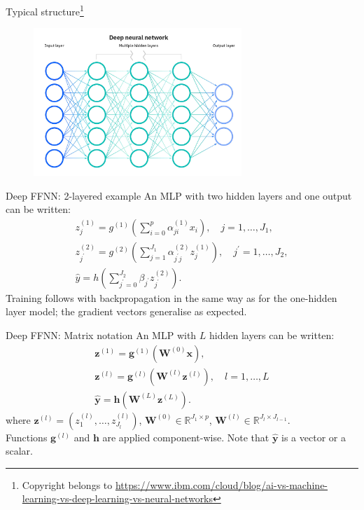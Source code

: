 \documentclass{beamer}
\begin{document}
\begin{frame}{Typical structure\footnote{Copyright belongs to \url{https://www.ibm.com/cloud/blog/ai-vs-machine-learning-vs-deep-learning-vs-neural-networks}}}
\begin{figure}
\includegraphics[width=0.7\textwidth]{Images/nn.jpg}
\end{figure}
\end{frame}
\begin{frame}{Deep FFNN: 2-layered example}
An MLP with two hidden layers and one output can be written:
$$
\begin{gathered}
z^{(1)}_{j}=g^{(1)}\left(\sum_{i=0}^{p} \alpha^{(1)}_{j i} x_{i}\right), \quad j=1, \ldots, J_{1}, \\
z^{(2)}_{j^{\prime}}=g^{(2)}\left(\sum_{j=1}^{J_{1}} \alpha^{(2)}_{j^{\prime} j} z^{(1)}_{j}\right), \quad j^{\prime}=1, \ldots, J_{2}, \\
\hat{y}=h\left(\sum_{j^{\prime}=0}^{J_{2}} \beta_{j^{\prime}} z^{(2)}_{ j^{\prime}}\right).
\end{gathered}
$$
Training follows with backpropagation in the same way as for the one-hidden layer model; the gradient vectors generalise as expected.
\end{frame}
\begin{frame}{Deep FFNN: Matrix notation}
An MLP with $L$ hidden layers can be written:
$$
\begin{gathered}
\mathbf{z}^{(1)}=\mathbf{g}^{(1)}\left(\mathbf{W}^{(0)}\mathbf{x}\right), \\
\mathbf{z}^{(l)}=\mathbf{g}^{(l)}\left(\mathbf{W}^{(l)}\mathbf{z}^{(l)}\right), \quad l=1,\dots,L \\
\hat{\mathbf{y}}=\mathbf{h}\left(\mathbf{W}^{(L)}\mathbf{z}^{(L)}\right).
\end{gathered}
$$
where $\mathbf{z}^{(l)}=(z^{(l)}_{1},\dots,z^{(l)}_{J_l})$, $\mathbf{W}^{(0)}\in \mathbb{R}^{J_1 \times p}$, $\mathbf{W}^{(l)}\in \mathbb{R}^{J_l \times J_{l-1}}$.\\ Functions $\mathbf{g}^{(l)}$ and $\mathbf{h}$ are applied component-wise. Note that $\hat{\mathbf{y}}$ is a vector or a scalar.
\end{frame}
\end{document}
